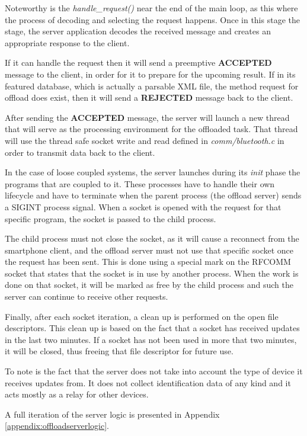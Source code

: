 Noteworthy is the \textit{handle_request()} near the end of the main loop, as this where the process of decoding and selecting the request happens. Once in this stage the stage, the server application decodes the received message and creates an appropriate response to the client.

If it can handle the request then it will send a preemptive \textbf{ACCEPTED} message to the client, in order for it to prepare for the upcoming result. If in its featured database, which is actually a parsable XML file, the method request for offload does exist, then it will send a \textbf{REJECTED} message back to the client.

After sending the \textbf{ACCEPTED} message, the server will launch a new thread that will serve as the processing environment for the offloaded task. That thread will use the thread safe socket write and read defined in \textit{comm/bluetooth.c} in order to transmit data back to the client.

In the case of loose coupled systems, the server launches during its \textit{init} phase the programs that are coupled to it. These processes have to handle their own lifecycle and have to terminate when the parent process (the offload server) sends a SIGINT process signal. When a socket is opened with the request for that specific program, the socket is passed to the child process. 

The child process must not close the socket, as it will cause a reconnect from the smartphone client, and the offload server must not use that specific socket once the request has been sent. This is done using a special mark on the RFCOMM socket that states that the socket is in use by another process. When the work is done on that socket, it will be marked as free by the child process and such the server can continue to receive other requests.

Finally, after each socket iteration, a clean up is performed on the open file descriptors. This clean up is based on the fact that a socket has received updates in the last two minutes. If a socket has not been used in more that two minutes, it will be closed, thus freeing that file descriptor for future use.

To note is the fact that the server does not take into account the type of device it receives updates from. It does not collect identification data of any kind and it acts mostly as a relay for other devices.

A full iteration of the server logic is presented in Appendix \ref{appendix:offloadserverlogic}.






